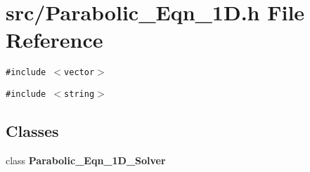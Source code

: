 \section{src/Parabolic\_\-Eqn\_\-1D.h File Reference}
\label{Parabolic__Eqn__1D_8h}
{\tt \#include $<$vector$>$}\par
{\tt \#include $<$string$>$}\par
\subsection*{Classes}
\begin{CompactItemize}
\item 
class \bf{Parabolic\_\-Eqn\_\-1D\_\-Solver}
\end{CompactItemize}
